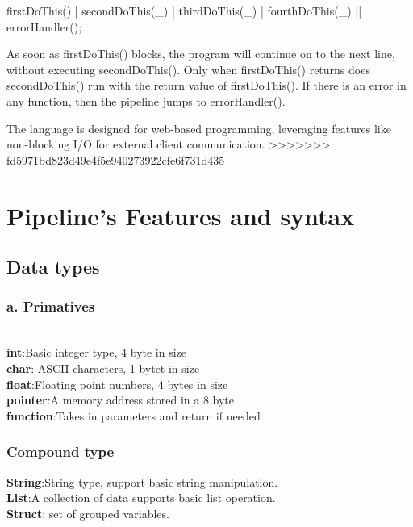 \documentclass[11pt]{article}
\begin{document}
firstDoThis() | secondDoThis(_) | thirdDoThis(_) | fourthDoThis(_) || errorHandler();

As soon as firstDoThis() blocks, the program will continue on to the next line, without executing secondDoThis(). Only when firstDoThis() returns does secondDoThis() run with the return value of firstDoThis(). If there is an error in any function, then the pipeline jumps to errorHandler().

The language is designed for web-based programming, leveraging features like non-blocking I/O for external client communication. 
>>>>>>> fd5971bd823d49e4f5e940273922cfe6f731d435

\section{Pipeline's Features and syntax}
\subsection*{Data types}

\subsubsection*{a. Primatives}\\

\quad\space\space\textbf{int}:Basic integer type, 4 byte in size \\

\textbf{char}: ASCII characters, 1 bytet in size\\

\textbf{float}:Floating point numbers, 4 bytes in size\\

\textbf{pointer}:A memory address stored in a 8 byte\\

\textbf{function}:Takes in parameters and return if needed
\subsubsection{Compound type}

\quad\space\space\textbf{String}:String type, support basic string manipulation.\\

\textbf{List}:A collection of data supports basic list operation.\\

\textbf{Struct}: set of grouped variables.\\
\end{document}
